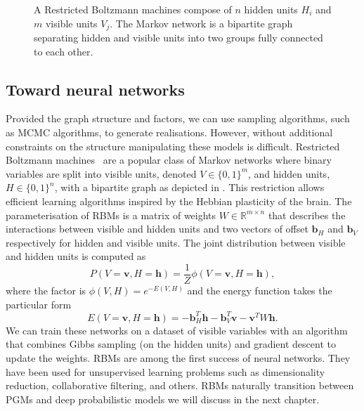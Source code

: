 \begin{figure}
    \centering
    \caption{A Restricted Boltzmann machines compose of $n$ hidden units $H_i$ and $m$ visible units $V_j$. The Markov network is a bipartite graph separating hidden and visible units into two groups fully connected to each other.}\label{fig:RBM}
\end{figure}
\subsection{Toward neural networks}
Provided the graph structure and factors, we can use sampling algorithms, such as MCMC algorithms, to generate realisations. However, without additional constraints on the structure manipulating these models is difficult.
Restricted Boltzmann machines~\citep[][RBMs]{hinton2002training} are a popular class of Markov networks where binary variables are split into visible units, denoted $V \in \{0, 1\}^m$, and hidden units, $H \in \{0, 1\}^n$, with a bipartite graph as depicted in . This restriction allows efficient learning algorithms inspired by the Hebbian plasticity of the brain. The parameterisation of RBMs is a matrix of weights $W \in \mathbb{R}^{m\times n}$ that describes the interactions between visible and hidden units and two vectors of offset $\bm{b}_H$ and $\bm{b}_V$ respectively for hidden and visible units. The joint distribution between visible and hidden units is computed as
$$ P(V=\bm{v}, H=\bm{h}) = \frac{1}{Z} \phi(V=\bm{v}, H=\bm{h}), $$
where the factor is $ \phi(V, H)=e^{-E(V, H)} $ and the energy function takes the particular form
$$ E(V=\bm{v}, H=\bm{h}) = -\bm{b}_H^T \bm{h} - \bm{b}_V^T \bm{v} - \bm{v}^T W \bm{h}.  $$
We can train these networks on a dataset of visible variables with an algorithm that combines Gibbs sampling (on the hidden units) and gradient descent to update the weights. RBMs are among the first success of neural networks. They have been used for unsupervised learning problems such as dimensionality reduction, collaborative filtering, and others. RBMs naturally transition between PGMs and deep probabilistic models we will discuss in the next chapter.
